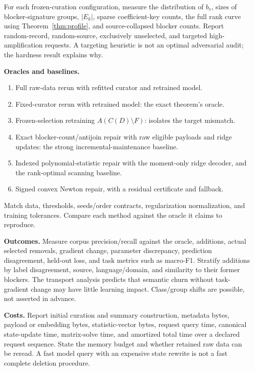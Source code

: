\documentclass[11pt,a4paper]{article}
\theoremstyle{definition}\newtheorem{definition}[theorem]{Definition}
\newcommand{\minus}{\setminus}
\begin{document}
For each frozen-curation configuration, measure the distribution of $b_v$, sizes of blocker-signature groups, $|E_k|$, sparse coefficient-key counts, the full rank curve using Theorem~\ref{thm:profile}, and source-collapsed blocker counts. Report random-record, random-source, exclusively unselected, and targeted high-amplification requests. A targeting heuristic is not an optimal adversarial audit; the hardness result explains why.

\textbf{Oracles and baselines.}
\begin{enumerate}
\item Full raw-data rerun with refitted curator and retrained model.
\item Fixed-curator rerun with retrained model: the exact theorem's oracle.
\item Frozen-selection retraining $A(C(D)\minus F)$: isolates the target mismatch.
\item Exact blocker-count/antijoin repair with raw eligible payloads and ridge updates: the strong incremental-maintenance baseline.
\item Indexed polynomial-statistic repair with the moment-only ridge decoder, and the rank-optimal scanning baseline.
\item Signed convex Newton repair, with a residual certificate and fallback.
\end{enumerate}
Match data, thresholds, seeds/order contracts, regularization normalization, and training tolerances. Compare each method against the oracle it claims to reproduce.

\textbf{Outcomes.} Measure corpus precision/recall against the oracle, additions, actual selected removals, gradient change, parameter discrepancy, prediction disagreement, held-out loss, and task metrics such as macro-F1. Stratify additions by label disagreement, source, language/domain, and similarity to their former blockers. The transport analysis predicts that semantic churn without task-gradient change may have little learning impact. Class/group shifts are possible, not asserted in advance.

\textbf{Costs.} Report initial curation and summary construction, metadata bytes, payload or embedding bytes, statistic-vector bytes, request query time, canonical state-update time, matrix-solve time, and amortized total time over a declared request sequence. State the memory budget and whether retained raw data can be reread. A fast model query with an expensive state rewrite is not a fast complete deletion procedure.
\end{document}
